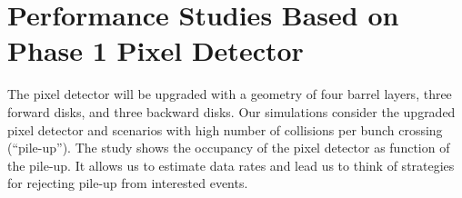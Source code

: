 \documentclass[a4paper,12pt,oneside]{article}
\newcommand{\HRule}{\rule{\linewidth}{0.5mm}}
\begin{document}

















\section{Performance Studies Based on Phase 1 Pixel Detector}

The pixel detector will be upgraded with a geometry of four barrel layers, three forward disks, and three backward disks. Our simulations consider the upgraded pixel detector and scenarios with high number of collisions per bunch crossing (“pile-up”). The study shows the occupancy of the pixel detector as function of the pile-up. It allows us to estimate data rates and lead us to think of strategies for rejecting pile-up from interested events.
\end{document}
